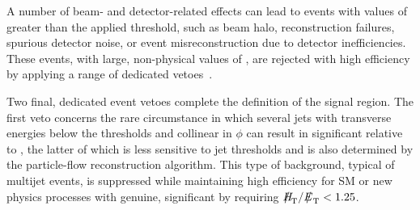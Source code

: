 
A number of beam- and detector-related effects can lead to events with
values of \alphat greater than the applied threshold, such as beam halo, reconstruction
failures, spurious detector noise, or event misreconstruction due to
detector inefficiencies. These events, with large, non-physical values
of \met, are rejected with high efficiency by applying a range of
dedicated vetoes~\cite{RA1Paper2012, cms-met}.

Two final, dedicated event vetoes complete the definition of the 
signal region. The first veto concerns the rare circumstance
in which several jets with transverse energies below the \Et
thresholds and collinear in $\phi$ can result in significant \mht
relative to \met, the latter of which is less sensitive to jet \Et
thresholds and is also determined by the particle-flow reconstruction
algorithm. This type of
background, typical of multijet events, is suppressed while
maintaining high efficiency for SM or new physics processes with
genuine, significant \met by requiring $\mht / \met < 1.25$. 

